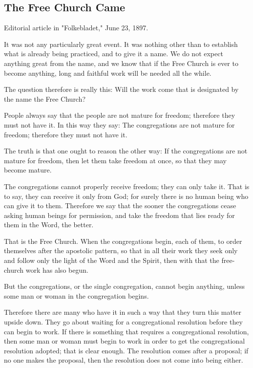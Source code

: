 
\subsection{The Free Church Came}

Editorial article in "Folkebladet," June 23, 1897.

It was not any particularly great event. It was nothing other than to establish what is already being practiced, and to give it a name. We do not expect anything great from the name, and we know that if the Free Church is ever to become anything, long and faithful work will be needed all the while.

The question therefore is really this: Will the work come that is designated by the name the Free Church?

People always say that the people are not mature for freedom; therefore they must not have it. In this way they say: The congregations are not mature for freedom; therefore they must not have it.

The truth is that one ought to reason the other way: If the congregations are not mature for freedom, then let them take freedom at once, so that they may become mature.

The congregations cannot properly receive freedom; they can only take it. That is to say, they can receive it only from God; for surely there is no human being who can give it to them. Therefore we say that the sooner the congregations cease asking human beings for permission, and take the freedom that lies ready for them in the Word, the better.

That is the Free Church. When the congregations begin, each of them, to order themselves after the apostolic pattern, so that in all their work they seek only and follow only the light of the Word and the Spirit, then with that the free-church work has also begun.

But the congregations, or the single congregation, cannot begin anything, unless some man or woman in the congregation begins.

Therefore there are many who have it in such a way that they turn this matter upside down. They go about waiting for a congregational resolution before they can begin to work. If there is something that requires a congregational resolution, then some man or woman must begin to work in order to get the congregational resolution adopted; that is clear enough. The resolution comes after a proposal; if no one makes the proposal, then the resolution does not come into being either.

